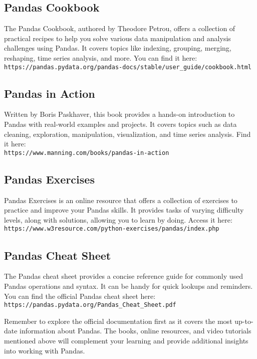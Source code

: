 \subsection{Pandas Cookbook}
The Pandas Cookbook, authored by Theodore Petrou, offers a collection of practical recipes to help you solve various data manipulation and analysis challenges using Pandas. It covers topics like indexing, grouping, merging, reshaping, time series analysis, and more. You can find it here: \\
\texttt{https://pandas.pydata.org/pandas-docs/stable/user\_guide/cookbook.html}

\subsection{Pandas in Action}
Written by Boris Paskhaver, this book \cite{Paskhaver:2021} provides a hands-on introduction to Pandas with real-world examples and projects. It covers topics such as data cleaning, exploration, manipulation, visualization, and time series analysis. Find it here: \\
\texttt{https://www.manning.com/books/pandas-in-action}

\subsection{Pandas Exercises}
Pandas Exercises is an online resource that offers a collection of exercises to practice and improve your Pandas skills. It provides tasks of varying difficulty levels, along with solutions, allowing you to learn by doing. Access it here: \\
\texttt{https://www.w3resource.com/python-exercises/pandas/index.php}



\subsection{Pandas Cheat Sheet}
The Pandas cheat sheet provides a concise reference guide for commonly used Pandas operations and syntax. It can be handy for quick lookups and reminders. You can find the official Pandas cheat sheet here: \\
\texttt{https://pandas.pydata.org/Pandas\_Cheat\_Sheet.pdf}

Remember to explore the official documentation first as it covers the most up-to-date information about Pandas. The books, online resources, and video tutorials mentioned above will complement your learning and provide additional insights into working with Pandas.




	

